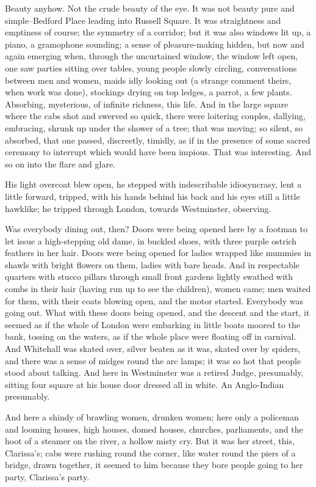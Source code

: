 \documentclass[lang=cn,10pt]{elegantbook}
\begin{document}
Beauty anyhow.  Not the crude beauty of the eye.  It was not beauty
pure and simple--Bedford Place leading into Russell Square.  It was
straightness and emptiness of course; the symmetry of a corridor;
but it was also windows lit up, a piano, a gramophone sounding; a
sense of pleasure-making hidden, but now and again emerging when,
through the uncurtained window, the window left open, one saw
parties sitting over tables, young people slowly circling,
conversations between men and women, maids idly looking out (a
strange comment theirs, when work was done), stockings drying on
top ledges, a parrot, a few plants.  Absorbing, mysterious, of
infinite richness, this life.  And in the large square where the
cabs shot and swerved so quick, there were loitering couples,
dallying, embracing, shrunk up under the shower of a tree; that was
moving; so silent, so absorbed, that one passed, discreetly,
timidly, as if in the presence of some sacred ceremony to interrupt
which would have been impious.  That was interesting.  And so on
into the flare and glare.

His light overcoat blew open, he stepped with indescribable
idiosyncrasy, lent a little forward, tripped, with his hands behind
his back and his eyes still a little hawklike; he tripped through
London, towards Westminster, observing.

Was everybody dining out, then?  Doors were being opened here by a
footman to let issue a high-stepping old dame, in buckled shoes,
with three purple ostrich feathers in her hair.  Doors were being
opened for ladies wrapped like mummies in shawls with bright
flowers on them, ladies with bare heads.  And in respectable
quarters with stucco pillars through small front gardens lightly
swathed with combs in their hair (having run up to see the
children), women came; men waited for them, with their coats
blowing open, and the motor started.  Everybody was going out.
What with these doors being opened, and the descent and the start,
it seemed as if the whole of London were embarking in little boats
moored to the bank, tossing on the waters, as if the whole place
were floating off in carnival.  And Whitehall was skated over,
silver beaten as it was, skated over by spiders, and there was a
sense of midges round the arc lamps; it was so hot that people
stood about talking.  And here in Westminster was a retired Judge,
presumably, sitting four square at his house door dressed all in
white.  An Anglo-Indian presumably.

And here a shindy of brawling women, drunken women; here only a
policeman and looming houses, high houses, domed houses, churches,
parliaments, and the hoot of a steamer on the river, a hollow misty
cry.  But it was her street, this, Clarissa's; cabs were rushing
round the corner, like water round the piers of a bridge, drawn
together, it seemed to him because they bore people going to her
party, Clarissa's party.
\end{document}
